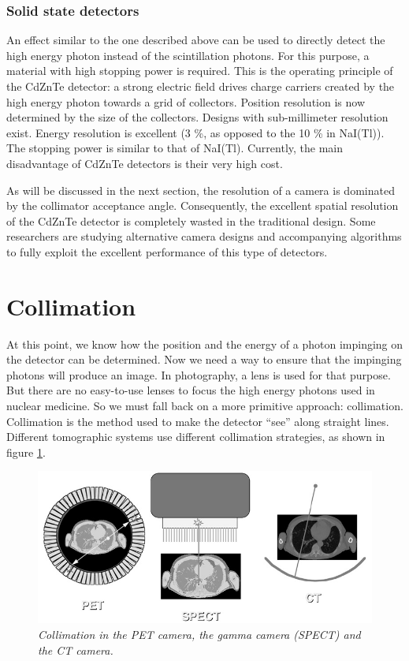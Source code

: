 \subsubsection{Solid state detectors}
An effect similar to the one described above can be used to directly
detect the high energy photon instead of the scintillation
photons. For this purpose, a material with high stopping power is
required. This is the operating principle of the CdZnTe detector: a
strong electric field drives charge carriers created by the high
energy photon towards a grid of collectors.  Position resolution is
now determined by the size of the collectors. Designs with
sub-millimeter resolution exist. Energy resolution is excellent (3 \%,
as opposed to the 10 \% in NaI(Tl)). The stopping power is similar to
that of NaI(Tl). Currently, the main disadvantage of CdZnTe detectors
is their very high cost.

As will be discussed in the next section, the resolution of a camera is
dominated by the collimator acceptance angle. Consequently, the excellent
spatial resolution of the CdZnTe detector is completely wasted in the
traditional design. Some researchers are studying alternative camera
designs and accompanying algorithms to fully exploit the excellent
performance of this type of detectors.


\section{Collimation}

At this point, we know how the position and the energy of a photon
impinging on the detector can be determined. Now we need a way to
ensure that the impinging photons will produce an image. In
photography, a lens is used for that purpose. But there are no
easy-to-use lenses to focus the high energy photons used in nuclear
medicine. So we must fall back on a more primitive approach:
collimation. Collimation is the method used to make the detector
``see'' along straight lines. Different tomographic systems use
different collimation strategies, as shown in figure
\ref{fig:spect_pet_ct}.

\begin{figure}[tb]
\centering
\includegraphics[width=1.5\figone]{figs/fig_spect_pet_ct.pdf}
\caption{\label{fig:spect_pet_ct} \emph{Collimation in the PET camera, the
gamma camera (SPECT) and the CT camera.}}
\end{figure}

